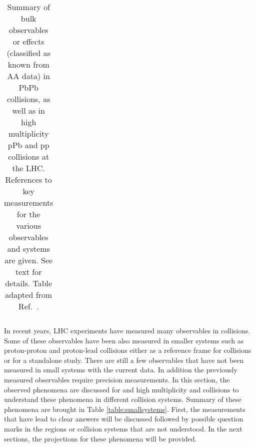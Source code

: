 \documentclass[../report.tex]{subfiles}
\begin{document}
{\begin{landscape}
\begin{table}[h!]
\begin{center}
\begin{tabular}{p{5cm}|p{3.6cm}|p{3.6cm}|p{3.6cm}| p{3cm} }
   \hline
    \hline
  \end{tabular}
  \caption{Summary of bulk observables or effects (classified as known from AA data) in PbPb collisions, as well as in high multiplicity pPb and pp collisions at the LHC. References to key measurements for the various observables and systems are given. See text for details. Table adapted from Ref.~\cite{Loizides:2016tew}.}
\end{center}  
\end{table}
\end{landscape}
}



In recent years, LHC experiments have measured many observables in \PbPb collisions. Some of these observables have been also measured in smaller systems such as proton-proton and proton-lead collisions either as a reference frame for \PbPb collisions or for a standalone study. There are still a few observables that have not been measured in small systems with the current data. In addition the previously measured observables require precision measurements. In this section, the observed phenomena are discussed for \PbPb and high multiplicity \pPb and \pp collisions to understand these phenomena in different collision systems. Summary of these phenomena are brought in Table \ref{table:smallsystems}. First, the measurements that have lead to clear answers will be discussed followed by possible question marks in the regions or collision systems that are not understood. In the next sections, the projections for these phenomena will be provided. 
\end{document}
